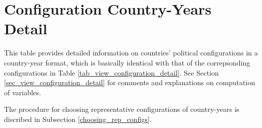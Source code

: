 \section{Configuration Country-Years Detail}\label{sec_view_configuration_country-years_detail}

This table provides detailed information on countries' political configurations in a country-year format, which is basically identical with that of the correpsonding configurations in Table \ref{tab_view_configuration_detail}. See Section \ref{sec_view_configuration_detail} for comments and explanations on computation of variables.

The procedure for choosing representative configurations of country-years is discribed in Subsection \ref{choosing_rep_configs}.

